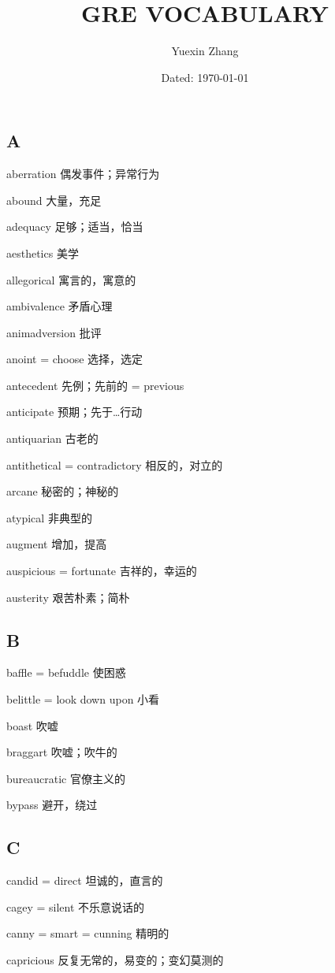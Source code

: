 \documentclass[UTF8, fontset = none, zihao = -4, linespread = 1.1]{ctexart}
\title{\vspace{-1in} GRE VOCABULARY}
\author{\kaishu Yuexin Zhang}
\date{Dated: \today}
\begin{document}
\maketitle

\begin{multicols}{2}


\subsection*{A}
aberration 偶发事件；异常行为

abound 大量，充足

adequacy 足够；适当，恰当

aesthetics 美学

allegorical 寓言的，寓意的

ambivalence 矛盾心理

animadversion 批评

anoint = choose 选择，选定

antecedent 先例；先前的 = previous

anticipate 预期；先于…行动

antiquarian 古老的

antithetical = contradictory 相反的，对立的

arcane 秘密的；神秘的

atypical 非典型的

augment 增加，提高

auspicious = fortunate 吉祥的，幸运的

austerity 艰苦朴素；简朴

\subsection*{B}
baffle = befuddle 使困惑

belittle = look down upon 小看

boast 吹嘘

braggart 吹嘘；吹牛的

bureaucratic 官僚主义的

bypass 避开，绕过

\subsection*{C}
candid = direct 坦诚的，直言的

cagey = silent 不乐意说话的

canny = smart = cunning 精明的

capricious 反复无常的，易变的；变幻莫测的


\end{multicols}
\end{document}
